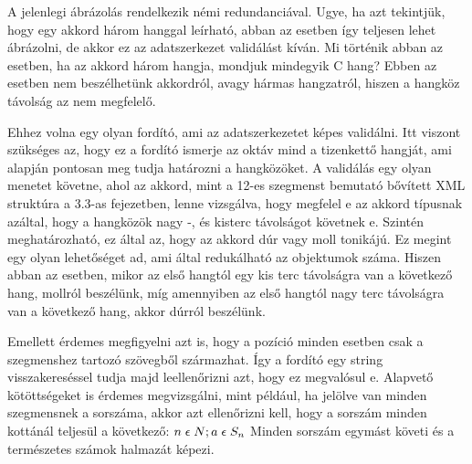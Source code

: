A jelenlegi ábrázolás rendelkezik némi redundanciával. Ugye, ha azt tekintjük, hogy egy akkord három hanggal leírható, abban az esetben így  teljesen lehet ábrázolni, de akkor ez az adatszerkezet validálást kíván. Mi történik abban az esetben, ha az akkord három hangja, mondjuk mindegyik C hang? Ebben az esetben nem beszélhetünk akkordról, avagy hármas hangzatról, hiszen a hangköz távolság az nem megfelelő.

Ehhez volna egy olyan fordító, ami az adatszerkezetet képes validálni. Itt viszont szükséges az, hogy ez a fordító ismerje az oktáv mind a tizenkettő hangját, ami alapján pontosan meg tudja határozni a hangközöket. A validálás egy olyan menetet követne, ahol az akkord, mint a 12-es szegmenst bemutató bővített XML struktúra a 3.3-as fejezetben, lenne vizsgálva, hogy megfelel e az akkord típusnak azáltal, hogy a hangközök nagy -, és kisterc távolságot követnek e. Szintén meghatározható, ez által az, hogy az akkord dúr vagy moll tonikájú. Ez megint egy olyan lehetőséget ad, ami által redukálható az objektumok száma. Hiszen abban az esetben, mikor az első hangtól egy kis terc távolságra van a következő hang, mollról beszélünk, míg amennyiben az első hangtól nagy terc távolságra van a következő hang, akkor dúrról beszélünk.

Emellett érdemes megfigyelni azt is, hogy a pozíció minden esetben csak a szegmenshez tartozó szövegből származhat. Így a fordító egy string visszakereséssel tudja majd leellenőrizni azt, hogy ez megvalósul e. Alapvető kötöttségeket is érdemes megvizsgálni, mint például, ha jelölve van minden szegmensnek a sorszáma, akkor azt ellenőrizni kell, hogy a sorszám minden kottánál teljesül a következő:
$	n\; \epsilon \; N; a\; \epsilon \; S_{n} \\$
Minden sorszám egymást követi és a természetes számok halmazát képezi. 